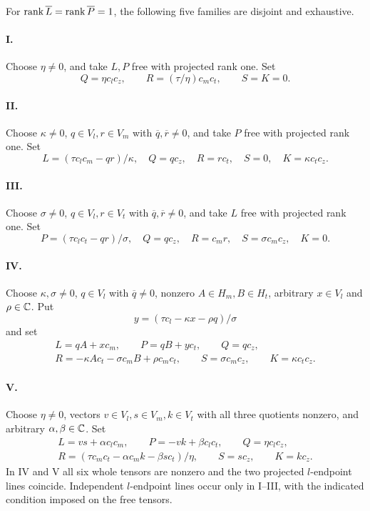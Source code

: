 \begin{proposition}\label{atlas:wedge11}
For \(\operatorname{rank}\overline L=\operatorname{rank}\overline P=1\), the following five families are
disjoint and exhaustive.

\paragraph{I.} Choose \(\eta\ne0\), and take \(L,P\) free with projected
rank one.  Set
\[
 Q=\eta c_lc_z,\qquad R=(\tau/\eta)c_mc_t,\qquad S=K=0.
\]

\paragraph{II.} Choose \(\kappa\ne0\), \(q\in V_l,r\in V_m\) with
\(\overline q,\overline r\ne0\), and take \(P\) free with projected rank one.
Set
\[
 L=(\tau c_lc_m-qr)/\kappa,\quad Q=q c_z,\quad R=r c_t,
 \quad S=0,\quad K=\kappa c_tc_z.
\]

\paragraph{III.} Choose \(\sigma\ne0\), \(q\in V_l,r\in V_t\) with
\(\overline q,\overline r\ne0\), and take \(L\) free with projected rank one.
Set
\[
 P=(\tau c_lc_t-qr)/\sigma,\quad Q=q c_z,\quad R=c_mr,
 \quad S=\sigma c_mc_z,\quad K=0.
\]

\paragraph{IV.} Choose \(\kappa,\sigma\ne0\), \(q\in V_l\) with
\(\overline q\ne0\), nonzero \(A\in H_m,B\in H_t\), arbitrary
\(x\in V_l\) and \(\rho\in\mathbb C\).  Put
\[
 y=(\tau c_l-\kappa x-\rho q)/\sigma
\]
and set
\begin{equation}\label{atlas:wedge11-IV}
 \begin{gathered}
 L=qA+xc_m,\qquad P=qB+yc_t,\qquad Q=q c_z,\\
 R=-\kappa Ac_t-\sigma c_mB+\rho c_mc_t,\qquad
 S=\sigma c_mc_z,\qquad K=\kappa c_tc_z.
 \end{gathered}
\end{equation}

\paragraph{V.} Choose \(\eta\ne0\), vectors \(v\in V_l,s\in V_m,k\in V_t\)
with all three quotients nonzero, and arbitrary \(\alpha,\beta\in\mathbb C\).
Set
\begin{equation}\label{atlas:wedge11-V}
 \begin{gathered}
 L=vs+\alpha c_lc_m,\qquad P=-vk+\beta c_lc_t,\qquad Q=\eta c_lc_z,\\
 R=(\tau c_mc_t-\alpha c_mk-\beta s c_t)/\eta,\qquad
 S=s c_z,\qquad K=k c_z.
 \end{gathered}
\end{equation}
In IV and V all six whole tensors are nonzero and the two projected
\(l\)-endpoint lines coincide.  Independent \(l\)-endpoint lines occur
only in I--III, with the indicated condition imposed on the free tensors.
\end{proposition}

